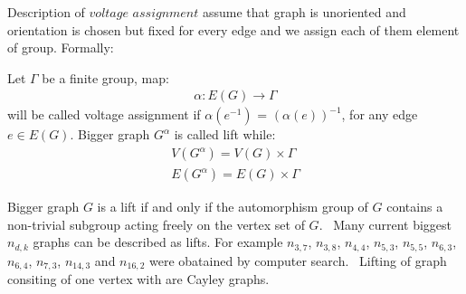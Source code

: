 \documentclass[a4paper,11pt,twoside]{report}%
\begin{document}
Description of $\textit{voltage assignment}$ assume that graph is unoriented and orientation is chosen but fixed for every edge and we assign each of them element of group. Formally: 

Let $\Gamma$ be a finite group, map:
\begin{align*}
	\alpha: E(G) \rightarrow \Gamma
\end{align*}	
will be called voltage assignment if $\alpha(e^{-1})$ = $(\alpha(e))^{-1}$, for any edge $e \in E(G)$. Bigger graph $G^{\alpha}$ is called lift while:  
\begin{align*}
	V(G^{\alpha}) = V(G) \times \Gamma \\
	E(G^{\alpha}) = E(G) \times \Gamma 
\end{align*}	


Bigger graph $G$ is a lift if and only if the automorphism group of $G$ contains a non-trivial subgroup acting freely on the vertex set of $G$.~\cite{Gross-Tucker} Many current biggest $n_{d,k}$ graphs can be described as lifts. For example $n_{3,7}$, $n_{3,8}$, $n_{4,4}$, $n_{5,3}$, $n_{5,5}$, $n_{6,3}$, $n_{6,4}$, $n_{7,3}$, $n_{14, 3}$ and $n_{16,2}$ were obatained by computer search.~\cite{Exoo} Lifting of graph consiting of one vertex with are Cayley graphs. 

{}

\end{document}
